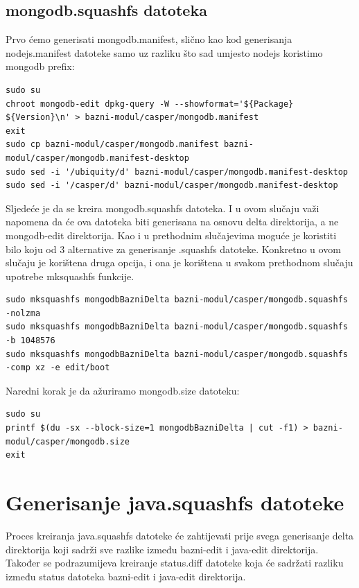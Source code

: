 \documentclass[12pt,vi]{mitthesis}
\begin{document}
\subsection*{mongodb.squashfs datoteka}
\indent
Prvo ćemo generisati mongodb.manifest, slično kao kod generisanja nodejs.manifest datoteke samo uz razliku što sad umjesto nodejs koristimo mongodb prefix:
\begin{lstlisting}[style=BashInputStyle]
sudo su
chroot mongodb-edit dpkg-query -W --showformat='${Package} ${Version}\n' > bazni-modul/casper/mongodb.manifest
exit
sudo cp bazni-modul/casper/mongodb.manifest bazni-modul/casper/mongodb.manifest-desktop
sudo sed -i '/ubiquity/d' bazni-modul/casper/mongodb.manifest-desktop
sudo sed -i '/casper/d' bazni-modul/casper/mongodb.manifest-desktop
\end{lstlisting}
\indent
Sljedeće je da se kreira mongodb.squashfs datoteka. I u ovom slučaju važi napomena da će ova datoteka biti generisana na osnovu delta direktorija, a ne mongodb-edit direktorija. Kao i u prethodnim slučajevima moguće je koristiti bilo koju od 3 alternative za generisanje .squashfs datoteke. Konkretno u ovom slučaju je korištena druga opcija, i ona je korištena u svakom prethodnom slučaju upotrebe mksquashfs funkcije.
\begin{lstlisting}[style=BashInputStyle]
sudo mksquashfs mongodbBazniDelta bazni-modul/casper/mongodb.squashfs -nolzma 
sudo mksquashfs mongodbBazniDelta bazni-modul/casper/mongodb.squashfs -b 1048576
sudo mksquashfs mongodbBazniDelta bazni-modul/casper/mongodb.squashfs -comp xz -e edit/boot
\end{lstlisting}

\noindent
Naredni korak je da ažuriramo mongodb.size datoteku:
\begin{lstlisting}[style=BashInputStyle]
sudo su
printf $(du -sx --block-size=1 mongodbBazniDelta | cut -f1) > bazni-modul/casper/mongodb.size
exit
\end{lstlisting}

\section*{Generisanje java.squashfs datoteke}
\indent
Proces kreiranja java.squashfs datoteke će zahtijevati prije svega generisanje delta direktorija koji sadrži sve razlike između bazni-edit i java-edit direktorija. Također se podrazumijeva kreiranje status.diff datoteke koja će sadržati razliku između status datoteka bazni-edit i java-edit direktorija.\\
\end{document}
